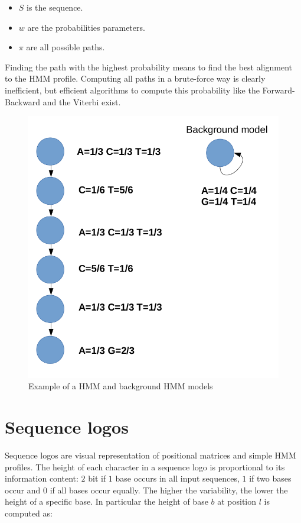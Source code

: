 		\begin{multicols}{3}
			\begin{itemize}
				\item $S$ is the sequence.
				\item $w$ are the probabilities parameters.
				\item $\pi$ are all possible paths.
			\end{itemize}
		\end{multicols}

		Finding the path with the highest probability means to find the best alignment to the HMM profile.
		Computing all paths in a brute-force way is clearly inefficient, but efficient algorithms to compute this probability like the Forward-Backward and the Viterbi exist.

		\begin{figure}[H]
			\centering
			\includegraphics[scale=0.3]{HMM.png}
			\caption{Example of a HMM and background HMM models}
			\label{fig:HMM}
			\end{figure}

	\section{Sequence logos}
	Sequence logos are visual representation of positional matrices and simple HMM profiles.
	The height of each character in a sequence logo is proportional to its information content: $2$ bit if $1$ base occurs in all input sequences, $1$ if two bases occur and $0$ if all bases occur equally.
	The higher the variability, the lower the height of a specific base.
	In particular the height of base $b$ at position $l$ is computed as:

